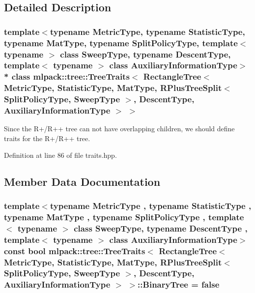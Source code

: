 \subsection{Detailed Description}
\subsubsection*{template$<$typename Metric\+Type, typename Statistic\+Type, typename Mat\+Type, typename Split\+Policy\+Type, template$<$ typename $>$ class Sweep\+Type, typename Descent\+Type, template$<$ typename $>$ class Auxiliary\+Information\+Type$>$\\*
class mlpack\+::tree\+::\+Tree\+Traits$<$ Rectangle\+Tree$<$ Metric\+Type, Statistic\+Type, Mat\+Type, R\+Plus\+Tree\+Split$<$ Split\+Policy\+Type, Sweep\+Type $>$, Descent\+Type, Auxiliary\+Information\+Type $>$ $>$}

Since the R+/\+R++ tree can not have overlapping children, we should define traits for the R+/\+R++ tree. 

Definition at line 86 of file traits.\+hpp.



\subsection{Member Data Documentation}
\subsubsection[{Binary\+Tree}]{\setlength{\rightskip}{0pt plus 5cm}template$<$typename Metric\+Type , typename Statistic\+Type , typename Mat\+Type , typename Split\+Policy\+Type , template$<$ typename $>$ class Sweep\+Type, typename Descent\+Type , template$<$ typename $>$ class Auxiliary\+Information\+Type$>$ const bool {\bf mlpack\+::tree\+::\+Tree\+Traits}$<$ {\bf Rectangle\+Tree}$<$ Metric\+Type, Statistic\+Type, Mat\+Type, {\bf R\+Plus\+Tree\+Split}$<$ Split\+Policy\+Type, Sweep\+Type $>$, Descent\+Type, Auxiliary\+Information\+Type $>$ $>$\+::Binary\+Tree = false\hspace{0.3cm}{\ttfamily [static]}}\label{classmlpack_1_1tree_1_1TreeTraits_3_01RectangleTree_3_01MetricType_00_01StatisticType_00_01MatTyd3300c6b7e2f56d4c1027298545eb7bf_a67771192a9b3358e5948ee3c00d0f53b}


